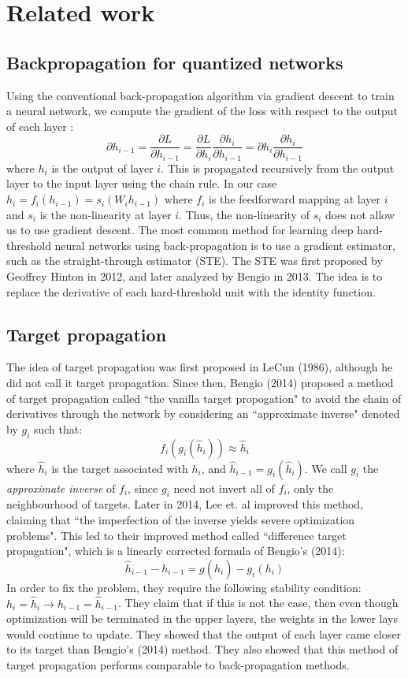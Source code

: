 \section{Related work}
\label{S:2}

\subsection{Backpropagation for quantized networks}

Using the conventional back-propagation algorithm via gradient descent to train a neural network, we compute the gradient of the loss with respect to the output of each layer : $$\partial h_{i-1}=\frac{\partial L}{\partial h_{i-1}}=\frac{\partial L}{\partial h_i}\frac{\partial h_i}{\partial h_{i-1}}=\partial h_i \frac{\partial h_i}{\partial h_{i-1}}$$ where $h_i$ is the output of layer $i$. This is propagated recursively from the output layer to the input layer using the chain rule. In our case $h_i=f_i(h_{i-1})=s_i(W_ih_{i-1})$ where $f_i$ is the feedforward mapping at layer $i$ and $s_i$ is the non-linearity at layer $i$. Thus, the non-linearity of $s_i$ does not allow us to use gradient descent. The most common method for learning deep hard-threshold neural networks using back-propagation is to use a gradient estimator, such as the straight-through estimator (STE). The STE was first proposed by Geoffrey Hinton in 2012, and later analyzed by Bengio in 2013. The idea is to replace the derivative of each hard-threshold unit with the identity function.\\

\subsection{Target propagation}
The idea of target propagation was first proposed in LeCun (1986), although he did not call it target propagation. Since then, Bengio (2014) proposed a method of target propagation called ``the vanilla target propogation" to avoid the chain of derivatives through the network by considering an ``approximate inverse" denoted by $g_i$ such that: $$f_i(g_i(\hat{h}_i)) \approx \hat{h}_i$$ where $\hat{h}_i$ is the target associated with $h_i$, and $\hat{h}_{i-1}=g_i(\hat{h}_i)$. We call $g_i$ the \emph{approximate inverse} of $f_i$, since $g_i$ need not invert all of $f_i$, only the neighbourhood of targets. Later in 2014, Lee et. al improved this method, claiming that ``the imperfection of the inverse yields severe optimization problems". This led to their improved method called ``difference target propagation", which is a linearly corrected formula of Bengio's (2014): $$\hat{h}_{i-1}-h_{i-1}=g(\hat{h}_i)-g_i(h_i)$$ In order to fix the problem, they require the following stability condition: $h_i = \hat{h}_i \rightarrow h_{i-1}=\hat{h}_{i-1}$. They claim that if this is not the case, then even though optimization will be terminated in the upper layers, the weights in the lower lays would continue to update. They showed that the output of each layer came closer to its target than Bengio's (2014) method. They also showed that this method of target propagation performs comparable to back-propagation methods. \\

